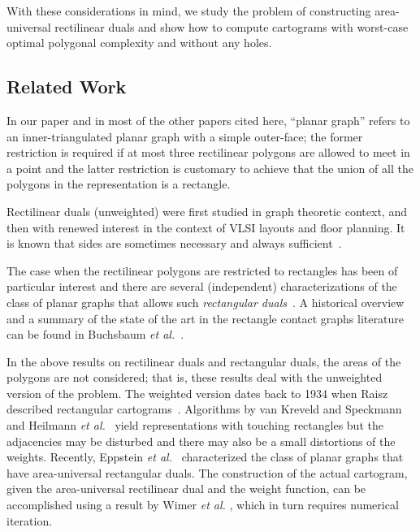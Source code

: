 \documentclass[11pt]{article}
\begin{document}
With these considerations in mind, we study the problem of
constructing area-universal rectilinear duals and show how to compute
cartograms with worst-case optimal polygonal complexity and without
any holes.



\subsection{Related Work}

In our paper and in most of the other papers cited here, ``planar graph''
refers to an inner-triangulated planar graph with a simple outer-face;
the former restriction is required if at most three rectilinear polygons are
allowed to meet in a point and the latter restriction is customary to
achieve that the union of all the polygons in the representation is a
rectangle.

Rectilinear duals (unweighted) were first studied in graph
theoretic context, and then with renewed interest in the context of
VLSI layouts and floor planning. It is known that  sides are sometimes
necessary and always sufficient~\cite{He99,Liao03,ys93}.

The case when the rectilinear
polygons are restricted to rectangles has been of particular interest and
there are several (independent) characterizations of the class of
planar graphs that allows such {\em rectangular duals}~\cite{u-drg-53,LL-abrf-84,kk-rdpg-85}.
A historical overview
and a summary of the state of the art in the rectangle contact graphs
literature can be found in Buchsbaum {\em et al.}~\cite{Buchsbaum08}.

In the above results on rectilinear duals and rectangular duals, the areas of
the polygons are not considered; that is, these
results deal with the unweighted version of the problem.
The weighted version dates back to 1934 when Raisz described rectangular
cartograms~\cite{r-rsc-34}.
Algorithms by van Kreveld and Speckmann~\cite{ks07} and
Heilmann {\em et al.}~\cite{hkps04} yield representations with
touching rectangles but the adjacencies may be disturbed and
there may also be a small distortions of the weights. Recently, Eppstein
{\em et al.}~\cite{EMVS} characterized the class of planar graphs that
have area-universal rectangular duals.
The construction of the actual cartogram, given the area-universal
rectilinear dual and the weight function, can be accomplished
using a result by Wimer \textit{et al.} \cite{WKC}, which in turn requires numerical iteration.
\end{document}
